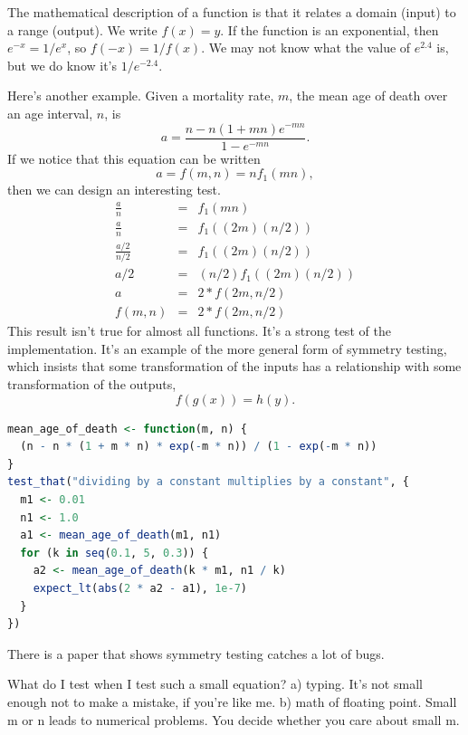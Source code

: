\documentclass[fleqn,10pt]{olplainarticle}
\begin{document}
The mathematical description of a function is that it relates
a domain (input) to a range (output). We write $f(x) = y$.
If the function is an exponential, then $e^{-x} = 1 / e^x$,
so $f(-x) = 1 / f(x)$. We may not know what the value of
$e^2.4$ is, but we do know it's $1 / e^{-2.4}$.

Here's another example. Given a mortality rate, $m$, the
mean age of death over an age interval, $n$, is
\begin{equation}
    a = \frac{n - n(1+m n)e^{-m n}}{1 - e^{-m n}}.
\end{equation}
If we notice that this equation can be written
\begin{equation}
    a = f(m, n) = n  f_1(m  n),
\end{equation}
then we can design an interesting test.
\begin{eqnarray}
    \frac{a}{n} &= &f_1(m  n) \\
    \frac{a}{n} &= & f_1((2  m)  (n / 2)) \\
    \frac{a/2}{n/2} &= & f_1((2  m)  (n / 2)) \\
    a /2 &= & (n/2) f_1((2  m)  (n / 2)) \\
    a &= &2 * f(2m, n/2) \\
    f(m, n) & =& 2 * f(2m, n/2)
\end{eqnarray}
This result isn't true for almost all functions. It's a strong test
of the implementation. It's an example of the more general
form of symmetry testing, which insists that some transformation
of the inputs has a relationship with some transformation of the 
outputs,
\begin{equation}
    f(g(x)) = h(y).
\end{equation}

\begin{lstlisting}[language=R]
mean_age_of_death <- function(m, n) {
  (n - n * (1 + m * n) * exp(-m * n)) / (1 - exp(-m * n))
}
test_that("dividing by a constant multiplies by a constant", {
  m1 <- 0.01
  n1 <- 1.0
  a1 <- mean_age_of_death(m1, n1)
  for (k in seq(0.1, 5, 0.3)) {
    a2 <- mean_age_of_death(k * m1, n1 / k)
    expect_lt(abs(2 * a2 - a1), 1e-7)
  }
})
\end{lstlisting}

There is a paper that shows symmetry testing catches a lot of bugs.

What do I test when I test such a small equation?
a) typing. It's not small enough not to make a mistake, if you're like me.
b) math of floating point. Small m or n leads to numerical problems.
You decide whether you care about small m.
\end{document}

